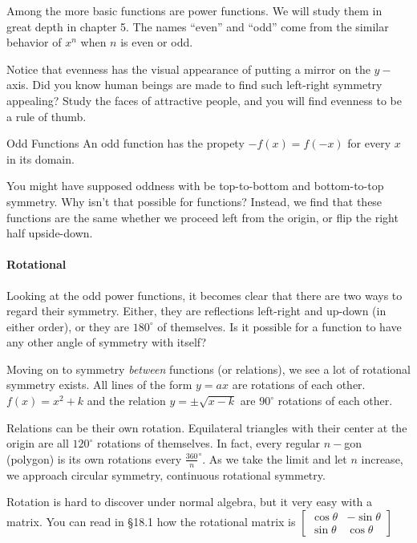 Among the more basic functions are power functions.  We will study them in great depth in
chapter 5.  The names ``even'' and ``odd'' come from the similar behavior of $x^n$ when
$n$ is even or odd.

Notice that evenness has the visual appearance of putting a mirror on the $y-$axis.  Did you 
know human beings are made to find such left-right symmetry appealing?  Study the faces of
attractive people, and you will find evenness to be a rule of thumb. 



\begin{derivation}{Odd Functions}
An odd function has the propety $-f(x)=f(-x)$ for every $x$ in its domain.
\end{derivation}


You might have supposed oddness with be top-to-bottom and bottom-to-top symmetry.  Why isn't
that possible for functions?  Instead, we find that these functions are the same whether we 
proceed left from the origin, or flip the right half upside-down.


\paragraph{Rotational}
Looking at the odd power functions, it becomes clear that there are two ways to regard their
symmetry.  Either, they are reflections left-right and up-down (in either order), or they are
$180^\circ$ of themselves.  Is it possible for a function to have any other angle of symmetry
with itself?

Moving on to symmetry \emph{between} functions (or relations), we see a lot of rotational
symmetry exists.  All lines of the form $y=ax$ are rotations of each other.  $f(x)=x^2+k$ and
the relation $y=\pm\sqrt{x-k}$ are $90^\circ$ rotations of each other.

Relations can be their own rotation.  Equilateral triangles with their center at the origin are 
all $120^\circ$ rotations of themselves.  In fact, every regular $n-$gon (polygon) is its
own rotations every $\frac{360}{n}^\circ$.  As we take the limit and let $n$ increase,
we approach circular symmetry, continuous rotational symmetry.

Rotation is hard to discover under normal algebra, but it very easy with a matrix.
You can read in §18.1 how the rotational matrix is 
$\begin{bmatrix} 
	\cos { \theta  }  & -\sin { \theta  }  \\ 
	\sin { \theta  }  & \cos { \theta  }  
\end{bmatrix}$



